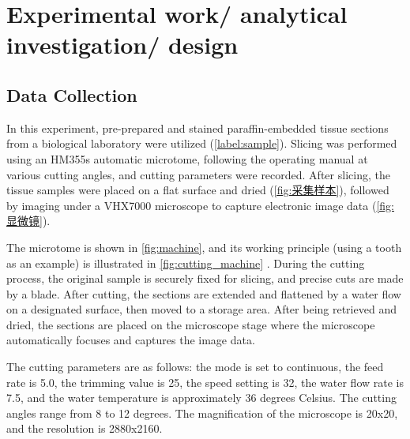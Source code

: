\section{Experimental work/ analytical investigation/ design}

\subsection{Data Collection}
In this experiment, pre-prepared and stained paraffin-embedded tissue sections from a biological laboratory were utilized (\autoref{label:sample}). Slicing was performed using an HM355s automatic microtome, following the operating manual at various cutting angles, and cutting parameters were recorded. After slicing, the tissue samples were placed on a flat surface and dried (\autoref{fig:采集样本}), followed by imaging under a VHX7000 microscope to capture electronic image data (\autoref{fig:显微镜}).

The microtome is shown in \autoref{fig:machine}, and its working principle (using a tooth as an example) is illustrated in \autoref{fig:cutting_machine} \cite{4.1}. During the cutting process, the original sample is securely fixed for slicing, and precise cuts are made by a blade. After cutting, the sections are extended and flattened by a water flow on a designated surface, then moved to a storage area. After being retrieved and dried, the sections are placed on the microscope stage where the microscope automatically focuses and captures the image data. 

The cutting parameters are as follows: the mode is set to continuous, the feed rate is 5.0, the trimming value is 25, the speed setting is 32, the water flow rate is 7.5, and the water temperature is approximately 36 degrees Celsius. The cutting angles range from 8 to 12 degrees. The magnification of the microscope is 20x20, and the resolution is 2880x2160.

